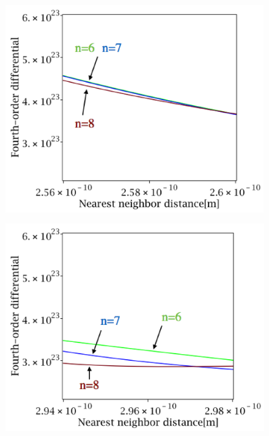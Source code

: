 \begin{figure}[htbp]
 \begin{minipage}[b]{0.5\linewidth}
  \centering
  \includegraphics[keepaspectratio, scale=0.41]
  {../image/fit3label.eps}
  \label{fit3}
 \end{minipage}
 \begin{minipage}[b]{0.5\linewidth}
  \centering
  \includegraphics[keepaspectratio, scale=0.41]
  {../image/fit_ag_label.eps}
  \label{fit4}
 \end{minipage}

\end{figure}
